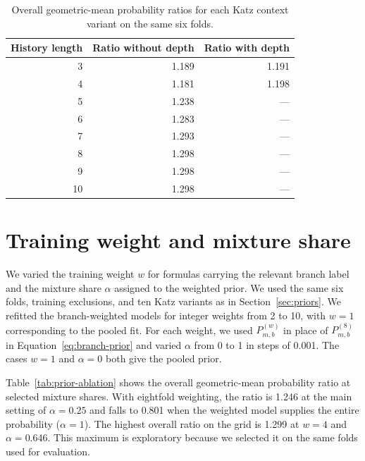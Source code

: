 \documentclass[10pt]{article}
\begin{document}
\begin{table}[H]\centering\small
\begin{tabular}{rrr}
\toprule
History length & Ratio without depth & Ratio with depth \\
\midrule
3 & 1.189 & 1.191 \\
4 & 1.181 & 1.198 \\
5 & 1.238 & --- \\
6 & 1.283 & --- \\
7 & 1.293 & --- \\
8 & 1.298 & --- \\
9 & 1.298 & --- \\
10 & 1.298 & --- \\
\bottomrule
\end{tabular}
\caption{Overall geometric-mean probability ratios for each Katz context variant on the same six folds.}
\label{tab:katz-variants}
\end{table}

\section{Training weight and mixture share}\label{app:prior-ablation}

We varied the training weight $w$ for formulas carrying the relevant branch label and the mixture share $\alpha$ assigned to the weighted prior. We used the same six folds, training exclusions, and ten Katz variants as in Section~\ref{sec:priors}. We refitted the branch-weighted models for integer weights from 2 to 10, with $w=1$ corresponding to the pooled fit. For each weight, we used $P^{(w)}_{m,b}$ in place of $P^{(8)}_{m,b}$ in Equation~\eqref{eq:branch-prior} and varied $\alpha$ from 0 to 1 in steps of 0.001. The cases $w=1$ and $\alpha=0$ both give the pooled prior.

Table~\ref{tab:prior-ablation} shows the overall geometric-mean probability ratio at selected mixture shares. With eightfold weighting, the ratio is 1.246 at the main setting of $\alpha=0.25$ and falls to 0.801 when the weighted model supplies the entire probability ($\alpha=1$). The highest overall ratio on the grid is 1.299 at $w=4$ and $\alpha=0.646$. This maximum is exploratory because we selected it on the same folds used for evaluation.
\end{document}
